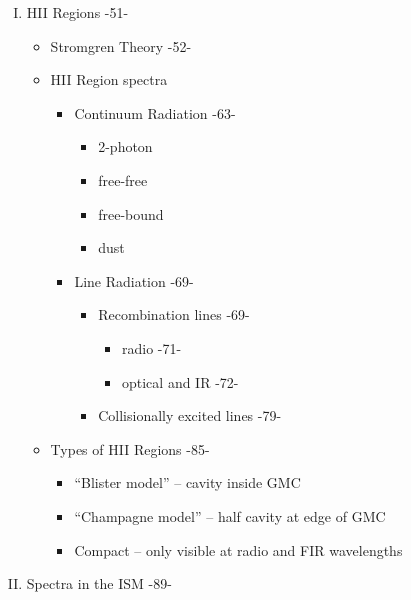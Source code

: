 \documentclass{article}
\begin{document}
\begin{enumerate}[I.]
\item HII Regions -51-
\begin{itemize}
    \item Stromgren Theory -52-
    \item HII Region spectra
    \begin{itemize}
        \item Continuum Radiation -63-
        \begin{itemize}
            \item 2-photon
            \item free-free
            \item free-bound
            \item dust
        \end{itemize}
        \item Line Radiation -69-
        \begin{itemize}
            \item Recombination lines -69-
            \begin{itemize}
                \item radio -71-
                \item optical and IR -72-
            \end{itemize}
            \item Collisionally excited lines -79-
        \end{itemize}
    \end{itemize}
\item Types of HII Regions -85-
    \begin{itemize}
        \item ``Blister model'' -- cavity inside GMC
        \item ``Champagne model'' -- half cavity at edge of GMC
        \item Compact -- only visible at radio and FIR wavelengths
    \end{itemize}
\end{itemize}

\item Spectra in the ISM -89-
\begin{itemize}


\end{itemize}
\end{enumerate}
\end{document}
